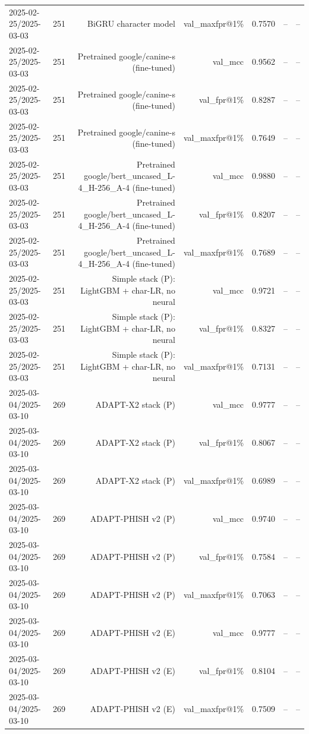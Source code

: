 \begin{table}[t]
\begin{tabular}{llrrrrr}
2025-02-25/2025-03-03 & 251 & BiGRU character model & val\_maxfpr@1\% & 0.7570 & -- & -- \\
2025-02-25/2025-03-03 & 251 & Pretrained google/canine-s (fine-tuned) & val\_mcc & 0.9562 & -- & -- \\
2025-02-25/2025-03-03 & 251 & Pretrained google/canine-s (fine-tuned) & val\_fpr@1\% & 0.8287 & -- & -- \\
2025-02-25/2025-03-03 & 251 & Pretrained google/canine-s (fine-tuned) & val\_maxfpr@1\% & 0.7649 & -- & -- \\
2025-02-25/2025-03-03 & 251 & Pretrained google/bert\_uncased\_L-4\_H-256\_A-4 (fine-tuned) & val\_mcc & 0.9880 & -- & -- \\
2025-02-25/2025-03-03 & 251 & Pretrained google/bert\_uncased\_L-4\_H-256\_A-4 (fine-tuned) & val\_fpr@1\% & 0.8207 & -- & -- \\
2025-02-25/2025-03-03 & 251 & Pretrained google/bert\_uncased\_L-4\_H-256\_A-4 (fine-tuned) & val\_maxfpr@1\% & 0.7689 & -- & -- \\
2025-02-25/2025-03-03 & 251 & Simple stack (P): LightGBM + char-LR, no neural & val\_mcc & 0.9721 & -- & -- \\
2025-02-25/2025-03-03 & 251 & Simple stack (P): LightGBM + char-LR, no neural & val\_fpr@1\% & 0.8327 & -- & -- \\
2025-02-25/2025-03-03 & 251 & Simple stack (P): LightGBM + char-LR, no neural & val\_maxfpr@1\% & 0.7131 & -- & -- \\
2025-03-04/2025-03-10 & 269 & ADAPT-X2 stack (P) & val\_mcc & 0.9777 & -- & -- \\
2025-03-04/2025-03-10 & 269 & ADAPT-X2 stack (P) & val\_fpr@1\% & 0.8067 & -- & -- \\
2025-03-04/2025-03-10 & 269 & ADAPT-X2 stack (P) & val\_maxfpr@1\% & 0.6989 & -- & -- \\
2025-03-04/2025-03-10 & 269 & ADAPT-PHISH v2 (P) & val\_mcc & 0.9740 & -- & -- \\
2025-03-04/2025-03-10 & 269 & ADAPT-PHISH v2 (P) & val\_fpr@1\% & 0.7584 & -- & -- \\
2025-03-04/2025-03-10 & 269 & ADAPT-PHISH v2 (P) & val\_maxfpr@1\% & 0.7063 & -- & -- \\
2025-03-04/2025-03-10 & 269 & ADAPT-PHISH v2 (E) & val\_mcc & 0.9777 & -- & -- \\
2025-03-04/2025-03-10 & 269 & ADAPT-PHISH v2 (E) & val\_fpr@1\% & 0.8104 & -- & -- \\
2025-03-04/2025-03-10 & 269 & ADAPT-PHISH v2 (E) & val\_maxfpr@1\% & 0.7509 & -- & -- \\

\end{tabular}
\end{table}
